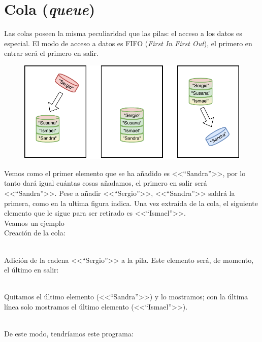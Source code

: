 \documentclass[11pt, oneside]{book}		%
\begin{document}
	\section{Cola (\textit{queue})}
	Las colas\cite{msdn:queue} poseen la misma peculiaridad que las pilas: el acceso a los datos es especial. El modo de acceso a datos es FIFO (\textit{First In First Out}), el primero en entrar será el primero en salir.
	\begin{figure}[H]
		\centering
		\includegraphics{img/TiposEnumerables/Cola/cola1.pdf}
	\end{figure} 
	Vemos como el primer elemento que se ha añadido es <<``Sandra''>>, por lo tanto dará igual cuántas cosas añadamos, el primero en salir será <<``Sandra''>>. Pese a añadir <<``Sergio''>>, <<``Sandra''>> saldrá la primera, como en la ultima figura indica. Una vez extraída de la cola, el siguiente elemento que le sigue para ser retirado es <<``Ismael''>>.\\
	Veamos un ejemplo\\
	Creación de la cola:
	\\\\\begin{minipage}[c]{0.95\textwidth}
		
	\end{minipage}
	Adición de la cadena <<``Sergio''>> a la pila. Este elemento será, de momento, el último en salir:
	\\\\\begin{minipage}[c]{0.95\textwidth}
		
	\end{minipage}
	Quitamos el último elemento (<<``Sandra''>>) y lo mostramos; con la última línea solo mostramos el último elemento (<<``Ismael''>>).
	\\\\\begin{minipage}[c]{0.95\textwidth}
		
	\end{minipage}
	De este modo, tendríamos este programa:
	\\\\\begin{minipage}[c]{0.95\textwidth}
		
	\end{minipage}
\end{document}
